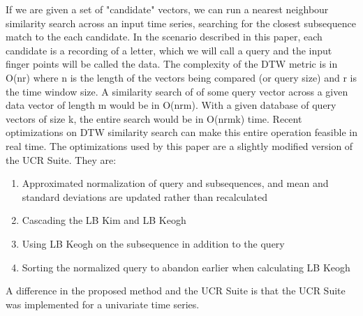 If we are given a set of "candidate" vectors, we can run a nearest neighbour similarity search across an input time series, searching for the closest subsequence match to the each candidate. In the scenario described in this paper, each candidate is a recording of a letter, which we will call a query and the input finger points will be called the data.
The complexity of the DTW metric is in O(nr) where n is the length of the vectors being compared (or query size) and r is the time window size. A similarity search of of some query vector across a given data vector of length m would be in O(nrm). With a given database of query vectors of size k, the entire search would be in O(nrmk) time.
Recent optimizations on DTW similarity search can make this entire operation feasible in real time. The optimizations used by this paper are a slightly modified version of the UCR Suite. They are: 
\begin{enumerate}
\item
Approximated normalization of query and subsequences, and mean and standard deviations are updated rather than recalculated
\item
Cascading the LB Kim and LB Keogh
\item
Using LB Keogh on the subsequence in addition to the query
\item
Sorting the normalized query to abandon earlier when calculating LB Keogh
\end{enumerate}
A difference in the proposed method and the UCR Suite is that the UCR Suite was implemented for a univariate time series. 
